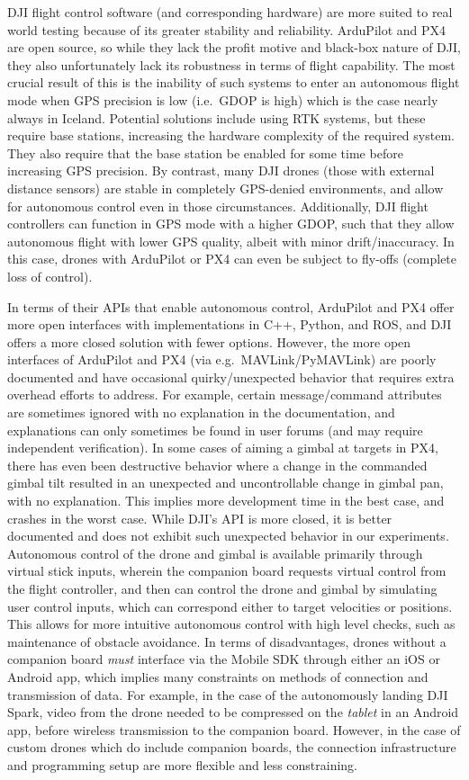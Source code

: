 DJI flight control software (and corresponding hardware) are more suited to real world testing
because of its greater stability and reliability.
ArduPilot and PX4 are open source, so while they lack the profit motive and black-box nature of DJI,
they also unfortunately lack its robustness in terms of flight capability.
The most crucial result of this is the inability of such systems to enter an autonomous flight mode
when GPS precision is low (i.e.~GDOP is high) which is the case nearly always in Iceland.
Potential solutions include using RTK systems, but these require base stations, increasing the hardware complexity
of the required system.
They also require that the base station be enabled for some time before increasing GPS precision.
By contrast, many DJI drones (those with external distance sensors) are stable in completely GPS-denied environments,
and allow for autonomous control even in those circumstances.
Additionally, DJI flight controllers can function in GPS mode with a higher GDOP,
such that they allow autonomous flight with lower GPS quality, albeit with minor drift/inaccuracy.
In this case, drones with ArduPilot or PX4 can even be subject to fly-offs (complete loss of control).

In terms of their APIs that enable autonomous control, ArduPilot and PX4 offer more open interfaces
with implementations in C++, Python, and ROS, and DJI offers a more closed solution with fewer options.
However, the more open interfaces of ArduPilot and PX4 (via e.g.~MAVLink/PyMAVLink) are poorly documented
and have occasional quirky/unexpected behavior that requires extra overhead efforts to address.
For example, certain message/command attributes are sometimes ignored with no explanation in the documentation,
and explanations can only sometimes be found in user forums (and may require independent verification).
In some cases of aiming a gimbal at targets in PX4, there has even been destructive behavior
where a change in the commanded gimbal tilt resulted in an unexpected and uncontrollable change in gimbal pan,
with no explanation.
This implies more development time in the best case, and crashes in the worst case.
While DJI's API is more closed, it is better documented and does not exhibit such unexpected behavior in our experiments.
Autonomous control of the drone and gimbal is available primarily through virtual stick inputs,
wherein the companion board requests virtual control from the flight controller,
and then can control the drone and gimbal by simulating user control inputs,
which can correspond either to target velocities or positions.
This allows for more intuitive autonomous control with high level checks, such as maintenance of obstacle avoidance.
In terms of disadvantages, drones without a companion board \textit{must} interface via the Mobile SDK through either an iOS or Android app,
which implies many constraints on methods of connection and transmission of data.
For example, in the case of the autonomously landing DJI Spark, video from the drone needed to be compressed on the \textit{tablet}
in an Android app, before wireless transmission to the companion board.
However, in the case of custom drones which do include companion boards, the connection infrastructure and programming setup are more flexible and less constraining.

